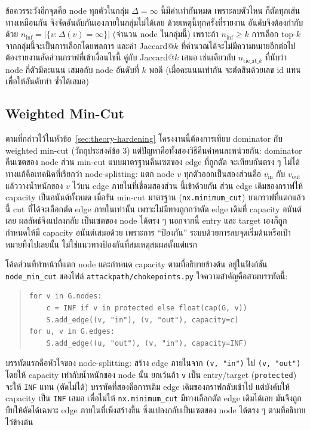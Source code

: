 ข้อควรระวังอีกจุดคือ node ทุกตัวในกลุ่ม $\Delta=\infty$ นี้มีค่าเท่ากันหมด เพราะลบตัวไหน
ก็ตัดทุกเส้นทางเหมือนกัน จึงจัดอันดับกันเองภายในกลุ่มไม่ได้เลย ด้วยเหตุนี้ทุกครั้งที่รายงาน
อันดับจึงต้องกำกับด้วย $n_{\inf} = |\{v : \Delta(v)=\infty\}|$ (จำนวน node ในกลุ่มนี้)
เพราะถ้า $n_{\inf} \geq k$ การเลือก top-$k$ จากกลุ่มนี้จะเป็นการเลือกโดยพลการ และค่า
Jaccard@$k$ ที่คำนวณได้จะไม่มีความหมายอีกต่อไป ต้องรายงานสัดส่วนกราฟที่เข้าเงื่อนไขนี้
คู่กับ Jaccard@$k$ เสมอ เช่นเดียวกับ $n_{\text{tie\_at\_}k}$ ที่นับว่า node กี่ตัวมีคะแนน
เสมอกับ node อันดับที่ $k$ พอดี (เมื่อคะแนนเท่ากัน จะตัดสินด้วยเลข id แทน เพื่อให้อันดับทำ
ซ้ำได้เสมอ)

\subsection{Weighted Min-Cut}\label{sec:design-mincut}

ตามที่กล่าวไว้ในหัวข้อ~\ref{sec:theory-hardening} โครงงานนี้ต้องการเทียบ dominator กับ
weighted min-cut (วัตถุประสงค์ข้อ 3) แต่ปัญหาคือทั้งสองวิธีคืนค่าคนละหน่วยกัน: dominator
คืนเซตของ node ส่วน min-cut แบบมาตรฐานคืนเซตของ edge ที่ถูกตัด จะเทียบกันตรง ๆ ไม่ได้
ทางแก้คือเทคนิคที่เรียกว่า node-splitting: แตก node $v$ ทุกตัวออกเป็นสองส่วนคือ
$v_{\text{in}}$ กับ $v_{\text{out}}$ แล้ววางน้ำหนักของ $v$ ไว้บน edge ภายในที่เชื่อมสองส่วน
นี้เข้าด้วยกัน ส่วน edge เดิมของกราฟให้ capacity เป็นอนันต์ทั้งหมด เมื่อรัน min-cut
มาตรฐาน (\texttt{nx.minimum\_cut}) บนกราฟที่แตกแล้วนี้ cut ที่ได้จะเลือกตัด edge
ภายในเท่านั้น เพราะไม่มีทางถูกกว่าตัด edge เดิมที่ capacity อนันต์เลย ผลลัพธ์จึงแปลงกลับ
เป็นเซตของ node ได้ตรง ๆ นอกจากนี้ entry และ target เองก็ถูกกำหนดให้มี capacity
อนันต์เสมอด้วย เพราะการ ``ป้องกัน'' ระบบด้วยการลบจุดเริ่มต้นหรือเป้าหมายทิ้งไปเลยนั้น
ไม่ใช่แนวทางป้องกันที่สมเหตุสมผลตั้งแต่แรก

โค้ดส่วนที่ทำหน้าที่แตก node และกำหนด capacity ตามที่อธิบายข้างต้น อยู่ในฟังก์ชัน
\texttt{node\_min\_cut} ของไฟล์ \texttt{attackpath/chokepoints.py}
ใจความสำคัญคือสามบรรทัดนี้:

\begin{quote}\small\begin{verbatim}
for v in G.nodes:
    c = INF if v in protected else float(cap(G, v))
    S.add_edge((v, "in"), (v, "out"), capacity=c)
for u, v in G.edges:
    S.add_edge((u, "out"), (v, "in"), capacity=INF)
\end{verbatim}\end{quote}

บรรทัดแรกคือหัวใจของ node-splitting: สร้าง edge ภายในจาก \texttt{(v, "in")} ไป
\texttt{(v, "out")} โดยให้ capacity เท่ากับน้ำหนักของ node นั้น ยกเว้นถ้า \texttt{v} เป็น
entry/target (\texttt{protected}) จะให้ \texttt{INF} แทน (ตัดไม่ได้) บรรทัดที่สองคือการเติม
edge เดิมของกราฟกลับเข้าไป แต่บังคับให้ capacity เป็น \texttt{INF} เสมอ เพื่อไม่ให้
\texttt{nx.minimum\_cut} มีทางเลือกตัด edge เดิมได้เลย มันจึงถูกบีบให้ตัดได้เฉพาะ edge
ภายในที่เพิ่งสร้างขึ้น ซึ่งแปลงกลับเป็นเซตของ node ได้ตรง ๆ ตามที่อธิบายไว้ข้างต้น


